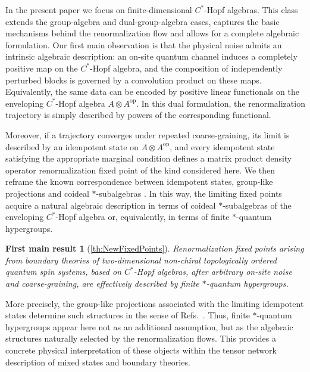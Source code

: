 \documentclass[a4paper,10pt]{amsart}
\newtheorem*{first-main-result}{First main result}
\theoremstyle{definition}
\begin{document}
In the present paper we focus on finite-dimensional $C^*$-Hopf algebras.
This class extends the group-algebra and dual-group-algebra cases, captures the basic mechanisms behind the renormalization flow and allows for a complete algebraic formulation. 
Our first main observation is that the physical noise admits an intrinsic algebraic description: an on-site quantum channel induces a completely positive map on the $C^*$-Hopf algebra, and the composition of independently perturbed blocks is governed by a convolution product on these maps.
Equivalently, the same data can be encoded by positive linear functionals on the enveloping $C^*$-Hopf algebra $A\otimes A^{\mathrm{op}}$.
In this dual formulation, the renormalization trajectory is simply described by powers of the corresponding functional.

Moreover, if a trajectory converges under repeated coarse-graining, its limit is described by an idempotent state on $A\otimes A^{\mathrm{op}}$, and every idempotent state satisfying the appropriate marginal condition defines a matrix product density operator renormalization fixed point of the kind considered here.
We then reframe the known correspondence between idempotent states, group-like projections and coideal $*$-subalgebras \cite{Franz_2009,franz_new_2009,salmi_idempotent_2012}.
In this way, the limiting fixed points acquire a natural algebraic description in terms of coideal $*$-subalgebras of the enveloping $C^*$-Hopf algebra or, equivalently, in terms of finite $*$-quantum hypergroups.
\begin{first-main-result}[\cref{th:NewFixedPoints}]
Renormalization fixed points arising from boundary theories of two-dimensional non-chiral topologically ordered quantum spin systems, based on $C^*$-Hopf algebras, after arbitrary on-site noise and coarse-graining, are effectively described by finite $*$-quantum hypergroups.
\end{first-main-result}
More precisely, the group-like projections associated with the limiting idempotent states determine such structures in the sense of Refs.~\cite{vandaele_fourier_2007,landstad_finite_2025}.
Thus, finite $*$-quantum hypergroups appear here not as an additional assumption, but as the algebraic structures naturally selected by the renormalization flows.
This provides a concrete physical interpretation of these objects within the tensor network description of mixed states and boundary theories.
\end{document}
